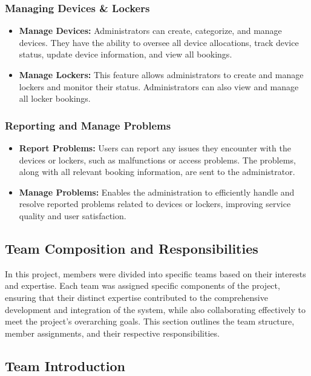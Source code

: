 \subsubsection{Managing Devices \& Lockers}
\begin{itemize}
\item \textbf{Manage Devices:} Administrators can create, categorize, and manage devices. They have the ability to oversee all device allocations, track device status, update device information, and view all bookings.

\item \textbf{Manage Lockers:} This feature allows administrators to create and manage lockers and monitor their status. Administrators can also view and manage all locker bookings.
\end{itemize}

\subsubsection{Reporting and Manage Problems}
\begin{itemize}

\item \textbf{Report Problems: }Users can report any issues they encounter with the devices or lockers, such as malfunctions or access problems. The problems, along with all relevant booking information, are sent to the administrator.

\item \textbf{Manage Problems: }Enables the administration to efficiently handle and resolve reported problems related to devices or lockers, improving service quality and user satisfaction.
\end{itemize}

\subsection{Team Composition and Responsibilities}
In this project, members were divided into specific teams based on their interests and expertise. Each team was assigned specific components of the project, ensuring that their distinct expertise contributed to the comprehensive development and integration of the system, while also collaborating effectively to meet the project's overarching goals. This section outlines the team structure, member assignments, and their respective responsibilities. 
\subsection{Team Introduction}
